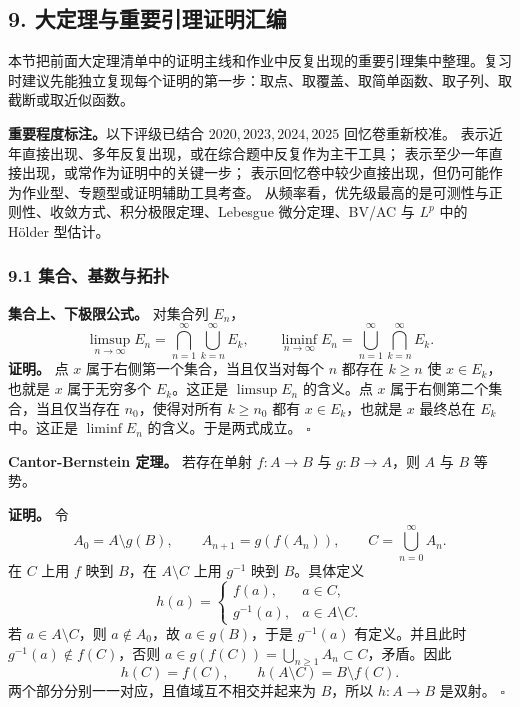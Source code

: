 \documentclass[
UTF8]{ctexart}
\newcommand{\impA}{\hspace{0.4em}{\small\textcolor{impAColor}{\textbf{[A 核心]}}}}
\newcommand{\impB}{\hspace{0.4em}{\small\textcolor{impBColor}{\textbf{[B 重要]}}}}
\newcommand{\impC}{\hspace{0.4em}{\small\textcolor{impCColor}{\textbf{[C 专题]}}}}
\newcommand{\thmlabel}[1]{\phantomsection\label{#1}}
\begin{document}
\subsection{9.
大定理与重要引理证明汇编}\label{ux5927ux5b9aux7406ux4e0eux91cdux8981ux5f15ux7406ux8bc1ux660eux6c47ux7f16}

本节把前面大定理清单中的证明主线和作业中反复出现的重要引理集中整理。复习时建议先能独立复现每个证明的第一步：取点、取覆盖、取简单函数、取子列、取截断或取近似函数。

\textbf{重要程度标注。}以下评级已结合 \(2020,2023,2024,2025\) 回忆卷重新校准。
\impA 表示近年直接出现、多年反复出现，或在综合题中反复作为主干工具；
\impB 表示至少一年直接出现，或常作为证明中的关键一步；
\impC 表示回忆卷中较少直接出现，但仍可能作为作业型、专题型或证明辅助工具考查。
从频率看，优先级最高的是可测性与正则性、收敛方式、积分极限定理、Lebesgue 微分定理、BV/AC 与 \(L^p\) 中的 Hölder 型估计。

\subsubsection{9.1
集合、基数与拓扑}\label{ux96c6ux5408ux57faux6570ux4e0eux62d3ux6251ux8bc1ux660e}

\thmlabel{thm:set-lims}\textbf{集合上、下极限公式。}\impB
对集合列 \(E_n\)，
\[
  \limsup_{n\to\infty}E_n
  =\bigcap_{n=1}^{\infty}\bigcup_{k=n}^{\infty}E_k,\qquad
  \liminf_{n\to\infty}E_n
  =\bigcup_{n=1}^{\infty}\bigcap_{k=n}^{\infty}E_k.
\]
\textbf{证明。} 点 \(x\) 属于右侧第一个集合，当且仅当对每个 \(n\) 都存在
\(k\ge n\) 使 \(x\in E_k\)，也就是 \(x\) 属于无穷多个 \(E_k\)。这正是
\(\limsup E_n\) 的含义。点 \(x\) 属于右侧第二个集合，当且仅当存在
\(n_0\)，使得对所有 \(k\ge n_0\) 都有 \(x\in E_k\)，也就是 \(x\) 最终总在
\(E_k\) 中。这正是 \(\liminf E_n\) 的含义。于是两式成立。 \(\square\)

\thmlabel{thm:cantor-bernstein}\textbf{Cantor-Bernstein 定理。}\impC
若存在单射 \(f:A\to B\) 与 \(g:B\to A\)，则 \(A\) 与 \(B\) 等势。

\textbf{证明。} 令
\[
  A_0=A\setminus g(B),\qquad A_{n+1}=g(f(A_n)),\qquad
  C=\bigcup_{n=0}^{\infty}A_n.
\]
在 \(C\) 上用 \(f\) 映到 \(B\)，在 \(A\setminus C\) 上用 \(g^{-1}\) 映到
\(B\)。具体定义
\[
  h(a)=
  \begin{cases}
    f(a), & a\in C,\\
    g^{-1}(a), & a\in A\setminus C.
  \end{cases}
\]
若 \(a\in A\setminus C\)，则 \(a\notin A_0\)，故 \(a\in g(B)\)，于是
\(g^{-1}(a)\) 有定义。并且此时 \(g^{-1}(a)\notin f(C)\)，否则
\(a\in g(f(C))=\bigcup_{n\ge1}A_n\subset C\)，矛盾。因此
\[
  h(C)=f(C),\qquad h(A\setminus C)=B\setminus f(C).
\]
两个部分分别一一对应，且值域互不相交并起来为 \(B\)，所以 \(h:A\to B\)
是双射。 \(\square\)
\end{document}
